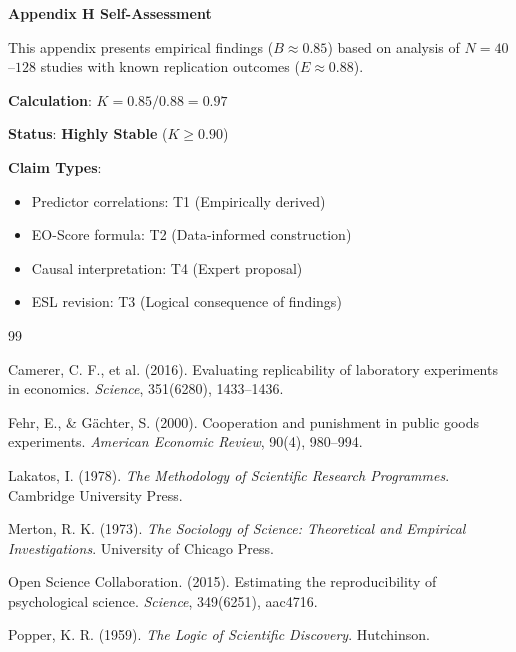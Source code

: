 \documentclass[11pt,a4paper]{article}
\begin{document}
\begin{eslbox}
\textbf{Appendix H Self-Assessment}

This appendix presents empirical findings ($B \approx 0.85$) based on analysis of $N = 40$--$128$ studies with known replication outcomes ($E \approx 0.88$).

\textbf{Calculation}: $K = 0.85/0.88 = 0.97$

\textbf{Status}: \textcolor{eslgreen}{\textbf{Highly Stable}} ($K \geq 0.90$)

\textbf{Claim Types}:
\begin{itemize}
    \item Predictor correlations: T1 (Empirically derived)
    \item EO-Score formula: T2 (Data-informed construction)
    \item Causal interpretation: T4 (Expert proposal)
    \item ESL revision: T3 (Logical consequence of findings)
\end{itemize}
\end{eslbox}


\newpage


\begin{thebibliography}{99}

Camerer, C. F., et al. (2016).
Evaluating replicability of laboratory experiments in economics.
\textit{Science}, 351(6280), 1433--1436.

Fehr, E., \& Gächter, S. (2000).
Cooperation and punishment in public goods experiments.
\textit{American Economic Review}, 90(4), 980--994.

Lakatos, I. (1978).
\textit{The Methodology of Scientific Research Programmes}.
Cambridge University Press.

Merton, R. K. (1973).
\textit{The Sociology of Science: Theoretical and Empirical Investigations}.
University of Chicago Press.

Open Science Collaboration. (2015).
Estimating the reproducibility of psychological science.
\textit{Science}, 349(6251), aac4716.

Popper, K. R. (1959).
\textit{The Logic of Scientific Discovery}.
Hutchinson.

\end{thebibliography}
\end{document}
